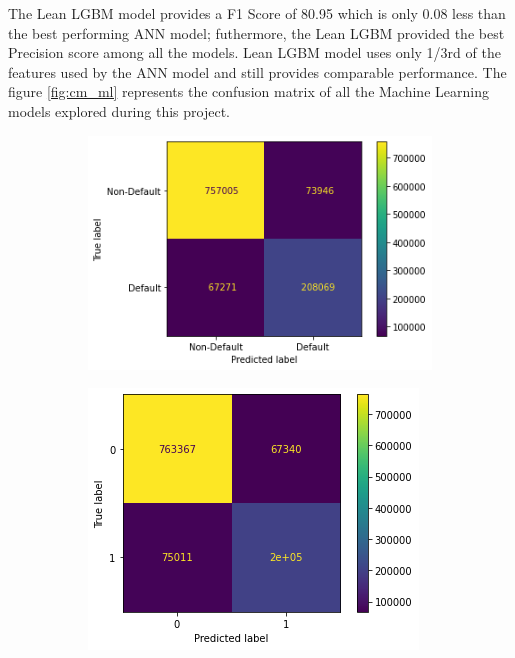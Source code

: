 \documentclass[twoside,11pt,a4paper]{article}
\begin{document}
The Lean \acs{LGBM} model provides a F1 Score of 80.95 which is only 0.08 less than the best performing \acs{ANN} model; futhermore, the Lean \acs{LGBM} provided the best Precision score among all the models. Lean \acs{LGBM} model uses only 1/3rd of the features used by the \acs{ANN} model and still provides comparable performance. The figure \ref{fig:cm_ml} represents the confusion matrix of all the Machine Learning models explored during this project.

\begin{figure}[h!]
	
	\begin{subfigure}{0.4 \textwidth}
		\includegraphics[width=1\linewidth, height=0.8\linewidth]{cm_svm}
		\label{fig:cm_svm}
	\end{subfigure}
	\hfill
	\begin{subfigure}{0.4 \textwidth}
		\includegraphics[width=1\linewidth, height=0.8\linewidth]{cm_rf}

\end{subfigure}
\end{figure}
\end{document}
